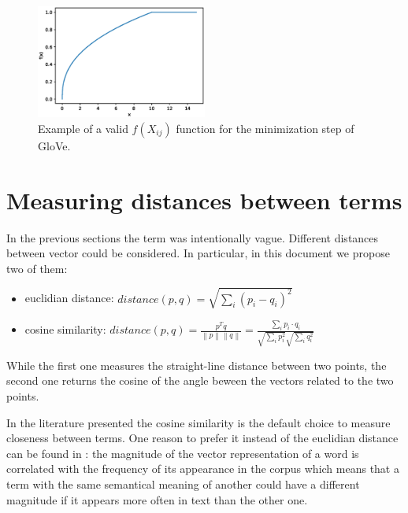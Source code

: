 \begin{figure}[h]
    \centering
    \includegraphics[width=0.5\textwidth]{images/glovef}
    \caption{Example of a valid $f(X_{ij})$ function for the minimization step of GloVe.}
    \label{fig:glovef}
\end{figure}

\section{Measuring distances between terms}
In the previous sections the term  was intentionally vague.
Different distances between vector could be considered.
In particular, in this document we propose two of them:
\begin{itemize}
    \item euclidian distance: $distance(p, q) = \sqrt{\sum_i (p_i - q_i)^2}$
    \item cosine similarity: $distance(p, q) = \frac{p^T q}{\left\lVert p \right\rVert \left\lVert q \right\rVert} = \frac{\sum_i p_i \cdot q_i}{\sqrt{\sum_i p_i^2} \sqrt{\sum_i q_i^2}}$
\end{itemize}

While the first one measures the straight-line distance between two points, the second one returns the cosine of the angle beween the vectors related to the two points.

In the literature presented the cosine similarity is the default choice to measure closeness between terms.
One reason to prefer it instead of the euclidian distance
can be found in \cite{DBLP:journals/corr/SchakelW15}: the magnitude of the vector representation of a word
is correlated with the frequency of its appearance in the corpus which means that
a term with the same semantical meaning of another could have a different
magnitude if it appears more often in text than the other one.